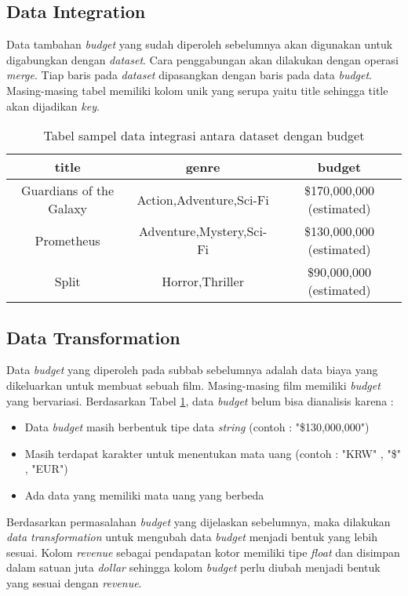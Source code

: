 \subsection{Data Integration}
Data tambahan \textit{budget} yang sudah diperoleh sebelumnya akan digunakan untuk digabungkan dengan \textit{dataset}. Cara penggabungan akan dilakukan dengan operasi \textit{merge}. Tiap baris pada \textit{dataset} dipasangkan dengan baris pada data \textit{budget}. Masing-masing tabel memiliki kolom unik yang serupa yaitu title sehingga title akan dijadikan \textit{key}. 

\begin{table}[H]
\caption{Tabel sampel data integrasi antara dataset dengan budget}
\centering
\begin{tabular}{|c|c|c|}
\hline 
title & genre & budget \\ 
\hline 
Guardians of the Galaxy & Action,Adventure,Sci-Fi
 & \$170,000,000 (estimated) \\ 
\hline 
Prometheus & Adventure,Mystery,Sci-Fi
 & \$130,000,000 (estimated) \\ 
\hline 
Split & Horror,Thriller & \$90,000,000 (estimated) \\ 
\hline 
\end{tabular} 
\label{tab:tabeldataintegrasiiterasi2}
\end{table} 


\subsection{Data Transformation}
Data \textit{budget} yang diperoleh pada subbab sebelumnya adalah data biaya yang dikeluarkan untuk membuat sebuah film. Masing-masing film memiliki \textit{budget} yang bervariasi. Berdasarkan Tabel \ref{tab:tabeldataintegrasiiterasi2}, data \textit{budget} belum bisa dianalisis karena : 

\begin{itemize}
\item Data \textit{budget} masih berbentuk tipe data \textit{string} (contoh : "\$130,000,000")
\item Masih terdapat karakter untuk menentukan mata uang (contoh : "KRW" , "\$" , "EUR")
\item Ada data yang memiliki mata uang yang berbeda
\end{itemize}

Berdasarkan permasalahan \textit{budget} yang dijelaskan sebelumnya, maka dilakukan \textit{data transformation} untuk mengubah data \textit{budget} menjadi bentuk yang lebih sesuai. Kolom \textit{revenue} sebagai pendapatan kotor memiliki tipe \textit{float} dan disimpan dalam satuan juta \textit{dollar} sehingga kolom \textit{budget} perlu diubah menjadi bentuk yang sesuai dengan \textit{revenue}. 

